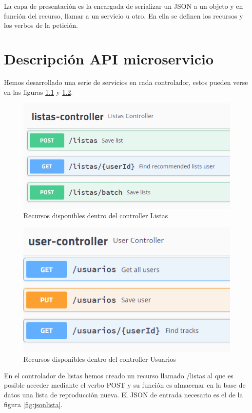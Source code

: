 \documentclass[12pt]{report} %
\begin{document}
La capa de presentación es la encargada de serializar un JSON a un objeto y en función del recurso, llamar a un servicio u otro. En ella se definen los recursos y los verbos de la petición. 

\chapter{Descripción API microservicio}

Hemos desarrollado una serie de servicios en cada controlador, estos pueden verse en las figuras \ref{fig:controllerlistas} y \ref{fig:controllerusuarios}. 

\begin{figure}
	\centering
	\includegraphics[width=0.7\linewidth]{imagenes/controllerListas}
	\caption{Recursos disponibles dentro del controller Listas}
	\label{fig:controllerlistas}
\end{figure}


\begin{figure}
	\centering
	\includegraphics[width=0.7\linewidth]{imagenes/controllerUsuarios}
	\caption{Recursos disponibles dentro del controller Usuarios}
	\label{fig:controllerusuarios}
\end{figure}

En el controlador de listas hemos creado un recurso llamado /listas al que es posible acceder mediante el verbo POST y su función es almacenar en la base de datos una lista de reproducción nueva. El JSON de entrada necesario es el de la figura \ref{fig:jsonlista}.
\end{document}
